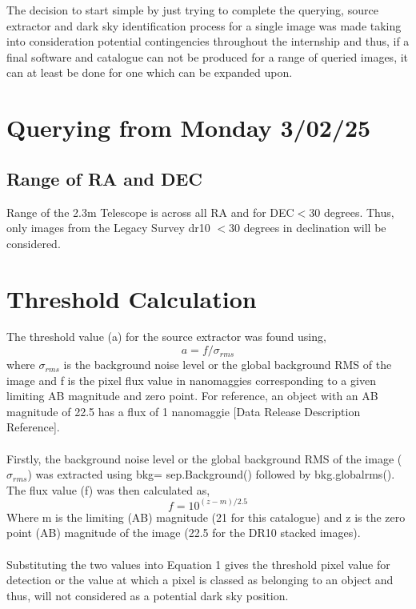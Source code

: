 \documentclass{article}
\begin{document}
The decision to start simple by just trying to complete the querying, source extractor and dark sky identification process for a single image was made taking into consideration potential contingencies throughout the internship and thus, if a final software and catalogue can not be produced for a range of queried images, it can at least be done for one which can be expanded upon.

\section{Querying from Monday 3/02/25}
\subsection{Range of RA and DEC}
Range of the 2.3m Telescope is across all RA and for DEC$<$30 degrees. 
Thus, only images from the Legacy Survey dr10 $<$30 degrees in declination will be considered.

\section{Threshold Calculation}
The threshold value (a) for the source extractor was found using, \begin{equation} a=f/\sigma_{rms} \end{equation}
where $\sigma_{rms}$ is the background noise level or the global background RMS of the image and f is the pixel flux value in nanomaggies corresponding to a given limiting AB magnitude and zero point. For reference, an object with an AB magnitude of 22.5 has a flux of 1 nanomaggie [Data Release Description Reference].\\
\\Firstly, the background noise level or the global background RMS of the image ($\sigma_{rms}$) was extracted using bkg= sep.Background() followed by bkg.globalrms(). The flux value (f) was then calculated as,  \begin{equation} 
f=10^{(z-m)/2.5}
\end{equation} 
Where m is the limiting (AB) magnitude (21 for this catalogue) and z is the zero point (AB) magnitude of the image (22.5 for the DR10 stacked images). \\
\\ 
Substituting the two values into Equation 1 gives the threshold pixel value for detection or the value at which a pixel is classed as belonging to an object and thus, will not considered as a potential dark sky position.
\end{document}
